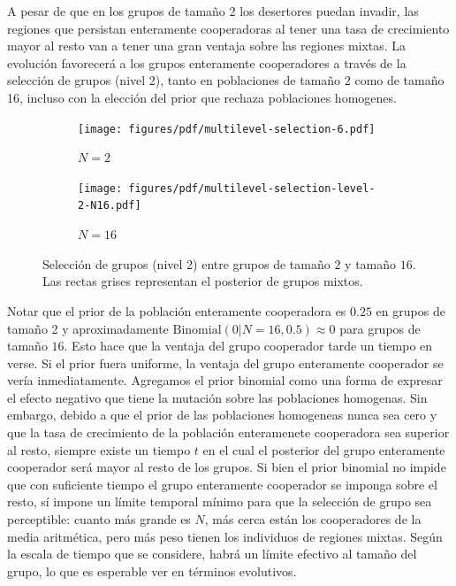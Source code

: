 \documentclass[a4paper,10pt]{article}
\newif\ifen
\newif\ifes
\newcommand{\en}[1]{\ifen#1\fi}
\newcommand{\es}[1]{\ifes#1\fi}
\newcommand{\Aa}{\en{e}\es{a}}
\begin{document}
A pesar de que en los grupos de tamaño 2 los desertores puedan invadir, las regiones que persistan enteramente cooperadoras al tener una tasa de crecimiento mayor al resto van a tener una gran ventaja sobre las regiones mixtas.
%
La evolución favorecerá a los grupos enteramente cooperadores a través de la selección de grupos (nivel 2), tanto en poblaciones de tamaño 2 como de tamaño 16, incluso con la elección del prior que rechaza poblaciones homogenes.
\begin{figure}[H]
    \centering
    \begin{subfigure}[b]{0.48\textwidth}
    \texttt{[image: figures/pdf/multilevel-selection-6.pdf]}
    \caption{$N=2$}
    \label{fig:multilevel-selection-6}
    \end{subfigure}
    \begin{subfigure}[b]{0.48\textwidth}
    \texttt{[image: figures/pdf/multilevel-selection-level-2-N16.pdf]}
    \caption{$N=16$}
    \label{fig:multilevel-selection-level-2-N16}
    \end{subfigure}
    \caption{
    Selección de grupos (nivel 2) entre grupos de tamaño $2$ y tamaño $16$.
    Las rectas grises representan el posterior de grupos mixtos.
    }
    \label{fig:posterior_level_2}
\end{figure}
%
Notar que el prior de la población enteramente cooperadora es $0.25$ en grupos de tamaño 2 y aproximadamente $ \text{Binomial}(0|N=16,0.5) \approx 0$ para grupos de tamaño $16$.
%
Esto hace que la ventaja del grupo cooperador tarde un tiempo en verse.
%
Si el prior fuera uniforme, la ventaja del grupo enteramente cooperador se vería inmediatamente.
%
Agregamos el prior binomial como una forma de expresar el efecto negativo que tiene la mutación sobre las poblaciones homogenas.
%
Sin embargo, debido a que el prior de las poblaciones homogeneas nunca sea cero y que la tasa de crecimiento de la población enteramenete cooperadora sea superior al resto, siempre existe un tiempo $t$ en el cual el posterior del grupo enteramente cooperador será mayor al resto de los grupos.
%
Si bien el prior binomial no impide que con suficiente tiempo el grupo enteramente cooperador se imponga sobre el resto, sí impone un límite temporal mínimo para que la selección de grupo sea perceptible: cuanto más grande es $N$, más cerca están los cooperadores de la media aritmética, pero más peso tienen los individuos de regiones mixtas.
%
Según la escala de tiempo que se considere, habrá un límite efectivo al tamaño del grupo, lo que es esperable ver en términos evolutivos.
\end{document}
